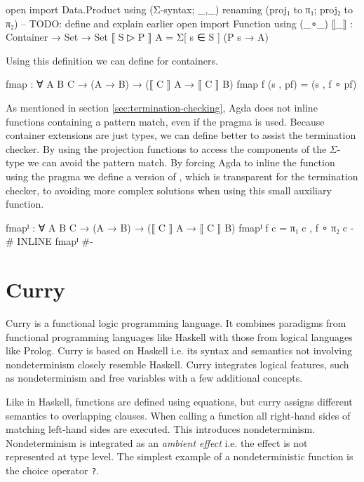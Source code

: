 \begin{code}
open import Data.Product using (Σ-syntax; _,_) renaming (proj₁ to π₁; proj₂ to π₂) -- TODO: define and explain earlier
open import Function using (_∘_)
⟦_⟧ : Container → Set → Set
⟦ S ▷ P ⟧ A = Σ[ s ∈ S ] (P s → A)
\end{code}
Using this definition we can define  for containers.

\begin{code}
fmap : ∀ {A B C} → (A → B) → (⟦ C ⟧ A → ⟦ C ⟧ B)
fmap f (s , pf) = (s , f ∘ pf)
\end{code}
As mentioned in section \ref{sec:termination-checking}, Agda does not inline
functions containing a pattern match, even if the  pragma
is used.
Because container extensions are just  types, we can define
 better to assist the termination checker.
By using the projection functions to access the components of the $\Sigma$-type
we can avoid the pattern match.
By forcing Agda to inline the function using the pragma we define a version of
, which is transparent for the termination checker, to
avoiding more complex solutions when using this small auxiliary function.

\begin{code}
fmapᴵ : ∀ {A B C} → (A → B) → (⟦ C ⟧ A → ⟦ C ⟧ B)
fmapᴵ f c = π₁ c , f ∘ π₂ c
{-# INLINE fmapᴵ #-}
\end{code}


\section{Curry}
\label{preliminaries:curry}

Curry \cite{Hanus95curry} is a functional logic programming language.
It combines paradigms from functional programming languages like Haskell
with those from logical languages like Prolog.
Curry is based on Haskell i.e. its syntax and semantics not involving
nondeterminism closely resemble Haskell.
Curry integrates logical features, such as nondeterminism and free variables
with a few additional concepts.

Like in Haskell, functions are defined using equations, but curry assigns
different semantics to overlapping clauses.
When calling a function all right-hand sides of matching left-hand sides are
executed.
This introduces nondeterminism.
Nondeterminism is integrated as an \textit{ambient effect} i.e. the effect is
not represented at type level.
The simplest example of a nondeterministic function is the choice operator
\texttt{?}.

